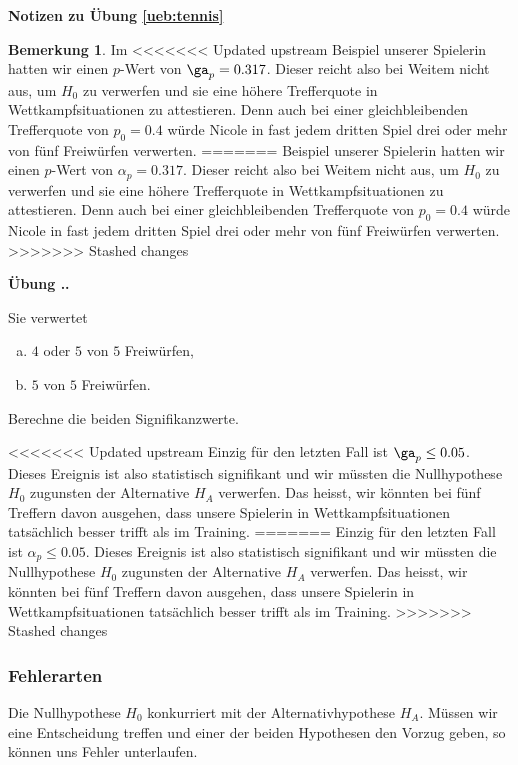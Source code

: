 \documentclass[%
<<<<<<< Updated upstream
11pt,%
twoside,%
titlepage,%
german,%
=======
11pt,%
twoside,%
titlepage,%
swissgerman,%
>>>>>>> Stashed changes
headsepline%
]{scrartcl}
\newcommand{\faEyeLightGray}{\textcolor{lightgray}{\faEye}} %
\newcommand{\faReturnGray}{\textcolor{gray}{\faMailReply}} %
\newcommand{\faEyeLightGray}{\textcolor{lightgray}{\faEye}} %
\theoremstyle{definition}
\newtheorem{bem}{Bemerkung}[subsection] %
\theoremstyle{plain}
\newcommand{\concatueb}[1]{ueb:#1}%
\newcommand{\concatlsg}[1]{lsg:#1}%
\newcounter{uebcounter}[section]
\renewcommand{\theuebcounter}{\thesection.\arabic{uebcounter}}  %
\newenvironment{lsg}[1]{%
    \par\noindent\textbf{Notizen zu Übung \ref{\concatueb{#1}}}\label{\concatlsg{#1}}
    \hfill\hyperref[\concatueb{#1}]{\faReturnGray}\par %
}{%
    \par%
}
\newenvironment{uebenv}[1]{%
    \refstepcounter{uebcounter}
    \par\noindent\textbf{Übung \theuebcounter.}%
    \label{\concatueb{#1}}\hfill\hyperref[\concatlsg{#1}]{\faEyeLightGray}\par
}{%
    \par
}
\newcounter{theo}[section]\setcounter{theo}{0}
\newcommand{\concatueb}[1]{ueb:#1}%
\newcommand{\concatlsg}[1]{lsg:#1}%
\newcounter{uebcounter}[section]
\renewcommand{\theuebcounter}{\thesection.\arabic{uebcounter}}  %
\newenvironment{lsg}[1]{%
    \par\noindent\textbf{Notizen zu Übung \ref{\concatueb{#1}}.}%
    \label{\concatlsg{#1}}
}{%
    \par%
}
\newenvironment{uebenv}[1]{%
    \refstepcounter{uebcounter}
    \par\noindent\textbf{Übung \theuebcounter.}%
    \label{\concatueb{#1}}\hfill\hyperref[\concatlsg{#1}]{\faEyeLightGray}\newline
}{%
    \par
}
\begin{document}
\begin{lsg}{tennis}
\begin{bem}
Im
<<<<<<< Updated upstream
Beispiel unserer Spielerin hatten wir einen $p$-Wert von $\ga_p=0.317$. Dieser reicht also bei Weitem nicht aus, um $H_0$ zu verwerfen und sie eine höhere Trefferquote in Wettkampfsituationen zu attestieren. Denn auch bei einer gleichbleibenden Trefferquote von $p_0=0.4$ würde Nicole in fast jedem dritten Spiel drei oder mehr von fünf Freiwürfen verwerten.
=======
Beispiel unserer Spielerin hatten wir einen $p$-Wert von $\alpha_p=0.317$. Dieser reicht also bei Weitem nicht aus, um $H_0$ zu verwerfen und sie eine höhere Trefferquote in Wettkampfsituationen zu attestieren. Denn auch bei einer gleichbleibenden Trefferquote von $p_0=0.4$ würde Nicole in fast jedem dritten Spiel drei oder mehr von fünf Freiwürfen verwerten.
>>>>>>> Stashed changes

\begin{uebenv}{signifikanzwert}
Sie verwertet
\begin{enumerate}[a)]
\item $4$ oder $5$ von $5$ Freiwürfen,
\item $5$ von $5$ Freiwürfen.
\end{enumerate}
Berechne die beiden Signifikanzwerte. 
\end{uebenv}



<<<<<<< Updated upstream
Einzig für den letzten Fall ist $\ga_p\leq0.05$. Dieses Ereignis ist also statistisch signifikant und wir müssten die Nullhypothese $H_0$ zugunsten der Alternative $H_A$ verwerfen. Das heisst, wir könnten bei fünf Treffern davon ausgehen, dass unsere Spielerin in Wettkampfsituationen tatsächlich besser trifft als im Training.
=======
Einzig für den letzten Fall ist $\alpha_p\leq0.05$. Dieses Ereignis ist also statistisch signifikant und wir müssten die Nullhypothese $H_0$ zugunsten der Alternative $H_A$ verwerfen. Das heisst, wir könnten bei fünf Treffern davon ausgehen, dass unsere Spielerin in Wettkampfsituationen tatsächlich besser trifft als im Training.
>>>>>>> Stashed changes

\subsubsection{Fehlerarten}

Die Nullhypothese $H_0$ konkurriert mit der Alternativhypothese $H_A$. Müssen wir eine Entscheidung treffen und einer der beiden Hypothesen den Vorzug geben, so können uns Fehler unterlaufen.


\end{bem}
\end{lsg}
\end{document}
